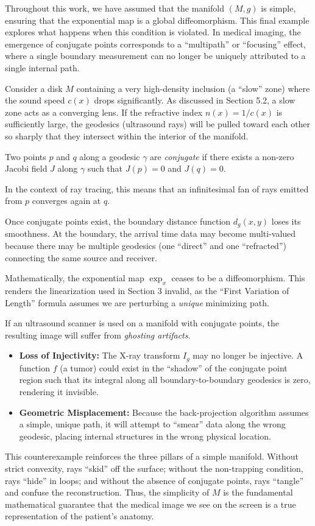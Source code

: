 Throughout this work, we have assumed that the manifold $(M, g)$ is simple, ensuring that the exponential map is a global diffeomorphism. This final example explores what happens when this condition is violated. In medical imaging, the emergence of conjugate points corresponds to a ``multipath'' or ``focusing'' effect, where a single boundary measurement can no longer be uniquely attributed to a single internal path.

Consider a disk $M$ containing a very high-density inclusion (a ``slow'' zone) where the sound speed $c(x)$ drops significantly. As discussed in Section 5.2, a slow zone acts as a converging lens. If the refractive index $n(x) = 1/c(x)$ is sufficiently large, the geodesics (ultrasound rays) will be pulled toward each other so sharply that they intersect within the interior of the manifold.

\begin{definition}
  Two points $p$ and $q$ along a geodesic $\gamma$ are \emph{conjugate} if there exists a non-zero Jacobi field $J$ along $\gamma$ such that $J(p) = 0$ and $J(q) = 0$.
\end{definition}

In the context of ray tracing, this means that an infinitesimal fan of rays emitted from $p$ converges again at $q$.

Once conjugate points exist, the boundary distance function $d_g(x, y)$ loses its smoothness. At the boundary, the arrival time data may become multi-valued because there may be multiple geodesics (one ``direct'' and one ``refracted'') connecting the same source and receiver.

Mathematically, the exponential map $\exp_x$ ceases to be a diffeomorphism. This renders the linearization used in Section 3 invalid, as the ``First Variation of Length'' formula assumes we are perturbing a \textit{unique} minimizing path.

If an ultrasound scanner is used on a manifold with conjugate points, the resulting image will suffer from \emph{ghosting artifacts}.
\begin{itemize}
  \item \textbf{Loss of Injectivity:} The X-ray transform $I_g$ may no longer be injective. A function $f$ (a tumor) could exist in the ``shadow'' of the conjugate point region such that its integral along all boundary-to-boundary geodesics is zero, rendering it invisible.
  \item \textbf{Geometric Misplacement:} Because the back-projection algorithm assumes a simple, unique path, it will attempt to ``smear'' data along the wrong geodesic, placing internal structures in the wrong physical location.
\end{itemize}

This counterexample reinforces the three pillars of a simple manifold. Without strict convexity, rays ``skid'' off the surface; without the non-trapping condition, rays ``hide'' in loops; and without the absence of conjugate points, rays ``tangle'' and confuse the reconstruction. Thus, the simplicity of $M$ is the fundamental mathematical guarantee that the medical image we see on the screen is a true representation of the patient's anatomy.
